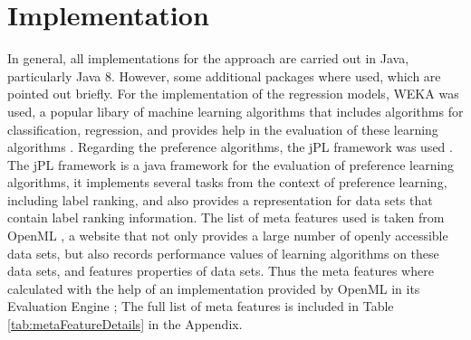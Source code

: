\section{Implementation}
In general, all implementations for the approach are carried out in Java, particularly Java 8. However, some additional packages where used, which are pointed out briefly. For the implementation of the regression models, WEKA was used, a popular libary of machine learning algorithms that includes algorithms for classification, regression, and provides help in the evaluation of these learning algorithms \cite{hall2009weka}. Regarding the preference algorithms, the jPL framework was used \cite{intelligent2017jpl}. The jPL framework is a java framework for the evaluation of preference learning algorithms, it implements several tasks from the context of preference learning, including label ranking, and also provides a representation for data sets that contain label ranking information. The list of meta features used is taken from OpenML \cite{OpenML2013}, a website that not only provides a large number of openly accessible data sets, but also records performance values of learning algorithms on these data sets, and features properties of data sets. Thus the meta features where calculated with the help of an implementation provided by OpenML in its Evaluation Engine \cite{openMLEvaluationEngine}; The full list of meta features is included in Table \ref{tab:metaFeatureDetails} in the Appendix.